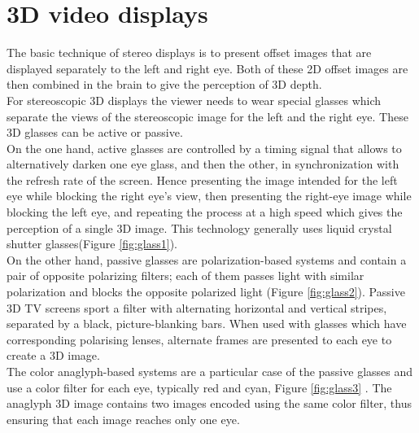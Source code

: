 \section{3D video displays}
The basic technique of stereo displays is to present offset images that are displayed separately to the left and right eye. Both of these 2D offset images are then combined in the brain to give the perception of 3D depth.\\
For stereoscopic 3D displays the viewer needs to wear special glasses which separate the views of the stereoscopic image for the left and the right eye. These 3D glasses can be active or passive.\\
On the one hand, active glasses are controlled by a timing signal that allows to alternatively darken one
eye glass, and then the other, in synchronization with the refresh rate of the screen. Hence presenting
the image intended for the left eye while blocking the right eye's view, then presenting the right-eye
image while blocking the left eye, and repeating the process at a high speed which gives the perception
of a single 3D image. This technology generally uses liquid crystal shutter glasses(Figure \ref{fig:glass1}).\\
On the other hand, passive glasses are polarization-based systems and contain a pair of opposite polarizing filters; each of them passes light with similar polarization and blocks the opposite polarized light (Figure \ref{fig:glass2}). Passive 3D TV screens sport a filter with alternating horizontal and vertical stripes, separated by a black, picture-blanking bars. When used with glasses which have corresponding polarising lenses, alternate frames are presented to each eye to create a 3D image.\\
The color anaglyph-based systems are a particular case of the passive glasses and use a color filter for
each eye, typically red and cyan, Figure \ref{fig:glass3} . The anaglyph 3D image contains two images encoded using the same color filter, thus ensuring that each image reaches only one eye.
